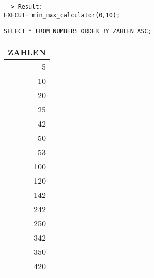 \documentclass{scrartcl}
\begin{document}
\begin{lstlisting}
--> Result: 
EXECUTE min_max_calculator(0,10);

SELECT * FROM NUMBERS ORDER BY ZAHLEN ASC;
\end{lstlisting}
\begin{tabular}{|r|}
\hline
 ZAHLEN \\
\hline
    5   \\
   10   \\
   20   \\
   25   \\
   42   \\
   50   \\
   53   \\
  100   \\
  120   \\
  142   \\
  242   \\
  250   \\
  342   \\
  350   \\
  420   \\
\hline
\end{tabular}
\end{document}
